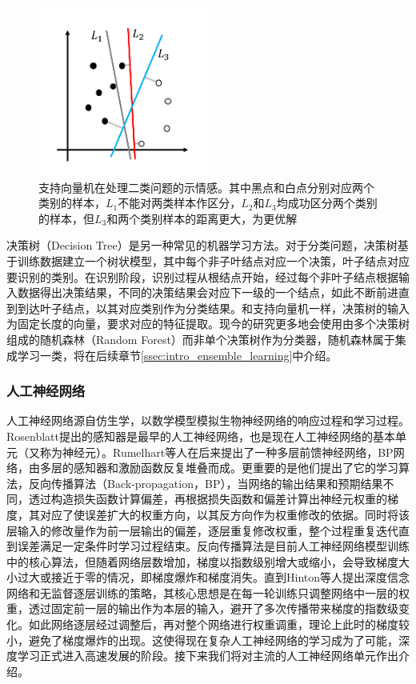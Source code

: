 \begin{figure}[H]
  \centering
  \includegraphics[width=0.5\textwidth]{img/svm.pdf}
  \caption{支持向量机在处理二类问题的示情感。其中黑点和白点分别对应两个类别的样本，$L_1$不能对两类样本作区分，$L_2$和$L_3$均成功区分两个类别的样本，但$L_3$和两个类别样本的距离更大，为更优解}
  \label{fig:svm}
\end{figure}

决策树（Decision Tree）是另一种常见的机器学习方法。对于分类问题，决策树基于训练数据建立一个树状模型，其中每个非子叶结点对应一个决策，叶子结点对应要识别的类别。在识别阶段，识别过程从根结点开始，经过每个非叶子结点根据输入数据得出决策结果，不同的决策结果会对应下一级的一个结点，如此不断前进直到到达叶子结点，以其对应类别作为分类结果。和支持向量机一样，决策树的输入为固定长度的向量，要求对应的特征提取。现今的研究更多地会使用由多个决策树组成的随机森林（Random Forest）而非单个决策树作为分类器，随机森林属于集成学习一类，将在后续章节\ref{ssec:intro_ensemble_learning}中介绍。

\subsubsection{人工神经网络}

人工神经网络源自仿生学，以数学模型模拟生物神经网络的响应过程和学习过程。Rosenblatt提出的感知器\cite{rosenblatt1958perceptron}是最早的人工神经网络，也是现在人工神经网络的基本单元（又称为神经元）。Rumelhart等人\cite{rumelhart1985learning}在后来提出了一种多层前馈神经网络，BP网络，由多层的感知器和激励函数反复堆叠而成。更重要的是他们提出了它的学习算法，反向传播算法（Back-propagation，BP），当网络的输出结果和预期结果不同，透过构造损失函数计算偏差，再根据损失函数和偏差计算出神经元权重的梯度，其对应了使误差扩大的权重方向，以其反方向作为权重修改的依据。同时将该层输入的修改量作为前一层输出的偏差，逐层重复修改权重，整个过程重复迭代直到误差满足一定条件时学习过程结束。反向传播算法是目前人工神经网络模型训练中的核心算法，但随着网络层数增加，梯度以指数级别增大或缩小，会导致梯度大小过大或接近于零的情况，即梯度爆炸和梯度消失。直到Hinton等人\cite{hinton2006fast}提出深度信念网络和无监督逐层训练的策略，其核心思想是在每一轮训练只调整网络中一层的权重，透过固定前一层的输出作为本层的输入，避开了多次传播带来梯度的指数级变化。如此网络逐层经过调整后，再对整个网络进行权重调重，理论上此时的梯度较小，避免了梯度爆炸的出现。这使得现在复杂人工神经网络的学习成为了可能，深度学习正式进入高速发展的阶段。接下来我们将对主流的人工神经网络单元作出介绍。

